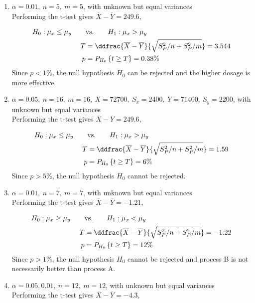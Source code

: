 \begin{enumerate}
	\item $\alpha = 0.01,\ n = 5,\ m = 5$, with unknown but equal variances\\
	Performing the t-test gives $ \overline{X} - \overline{Y} = 249.6 $,
	
	\begin{align}
		H_0 : \mu_x \leq \mu_y \qquad &\text{vs.} \qquad H_1 : \mu_x > \mu_y \nonumber \\
		T &= \ddfrac{ \overline{X} - \overline{Y} }{\sqrt{S_P^2/n + S_P^2/m}} = 3.544 \nonumber \\
		p &= P_{H_0}\left\{t \geq T\right\} = 0.38\% 
	\end{align}
	Since $ p < 1\% $, the null hypothesis $ H_0 $ can be rejected and the higher dosage is more effective.
	
	\item $\alpha = 0.05,\ n = 16,\ m = 16,\ \overline{X} = 72700,\ S_x = 2400,\ \overline{Y} = 71400,\ S_y = 2200$, with unknown but equal variances\\
	Performing the t-test gives $ \overline{X} - \overline{Y} = 249.6 $,
	
	\begin{align}
		H_0 : \mu_x \leq \mu_y \qquad &\text{vs.} \qquad H_1 : \mu_x > \mu_y \nonumber \\
		T &= \ddfrac{ \overline{X} - \overline{Y} }{\sqrt{S_P^2/n + S_P^2/m}} = 1.59 \nonumber \\
		p &= P_{H_0}\left\{t \geq T\right\} = 6\% 
	\end{align}
	Since $ p > 5\% $, the null hypothesis $ H_0 $ cannot be rejected.
	
	\item $\alpha = 0.01,\ n = 7,\ m = 7$, with unknown but equal variances\\
	Performing the t-test gives $ \overline{X} - \overline{Y} = -1.21 $,
	
	\begin{align}
		H_0 : \mu_x \geq \mu_y \qquad &\text{vs.} \qquad H_1 : \mu_x < \mu_y \nonumber \\
		T &= \ddfrac{ \overline{X} - \overline{Y} }{\sqrt{S_P^2/n + S_P^2/m}} = -1.22 \nonumber \\
		p &= P_{H_0}\left\{t \geq T\right\} = 12\% 
	\end{align}
	Since $ p > 1\% $, the null hypothesis $ H_0 $ cannot be rejected and process B is not necessarily better than process A.
	
	\item $\alpha = 0.05, 0.01,\ n = 12,\ m = 12$, with unknown but equal variances\\
	Performing the t-test gives $ \overline{X} - \overline{Y} = -4.3 $,
	

\end{enumerate}
